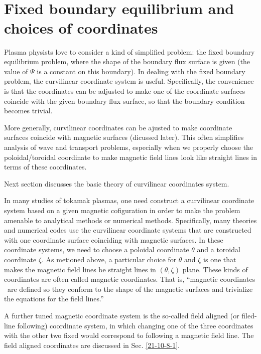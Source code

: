 \documentclass{llncs}
\begin{document}
\

\

\

\

\section{Fixed boundary equilibrium and choices of coordinates}

Plasma physists love to consider a kind of simplified problem: the fixed
boundary equilibrium problem, where the shape of the boundary flux surface is
given (the value of $\Psi$ is a constant on this boundary). In dealing with
the fixed boundary problem, the curvilinear coordinate system is useful.
Specifically, the convenience is that the coordinates can be adjusted to make
one of the coordinate surfaces coincide with the given boundary flux surface,
so that the boundary condition becomes trivial.

More generally, curvilinear coordinates can be ajusted to make coordinate
surfaces coincide with magnetic surfaces (dicussed later). This often
simplifies analysis of wave and transport problems, especially when we
properly choose the poloidal/toroidal coordinate to make magnetic field lines
look like straight lines in terms of these coordinates.

Next section discusses the basic theory of curvilinear coordinates
system{\cite{boozer2005}}.

In many studies of tokamak plasmas, one need construct a curvilinear
coordinate system based on a given magnetic cofiguration in order to make the
problem amenable to analytical methods or numerical methods. Specifically,
many theories and numerical codes use the curvilinear coordinate systems that
are constructed with one coordinate surface coinciding with magnetic surfaces.
In these coordinate systems, we need to choose a poloidal coordinate $\theta$
and a toroidal coordinate $\zeta$. As metioned above, a particular choice for
$\theta$ and $\zeta$ is one that makes the magnetic field lines be straight
lines in $(\theta, \zeta)$ plane. These kinds of coordinates are often called
magnetic coordinates. That is, ``magnetic coordinates \ are defined so they
conform to the shape of the magnetic surfaces and trivialize the equations for
the field lines.''

A further tuned magnetic coordinate system is the so-called field aligned (or
filed-line following) coordinate system, in which changing one of the three
coordinates with the other two fixed would correspond to following a magnetic
field line. The field aligned coordinates are discussed in Sec.
\ref{21-10-8-1}.
\end{document}
